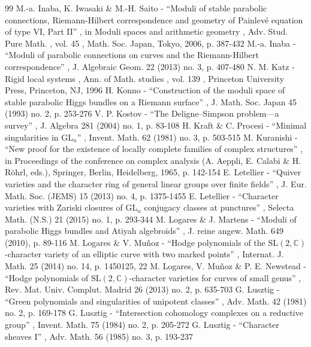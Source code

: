 \documentclass[11pt]{article}
\theoremstyle{definition}
\theoremstyle{plain}
\begin{document}
\begin{thebibliography}{99}
 M.-a. Inaba, K. Iwasaki \& M.-H. Saito - “Moduli of stable parabolic connections, Riemann-Hilbert correspondence and geometry of Painlevé equation of type VI, Part II” , in Moduli spaces and arithmetic geometry , Adv. Stud. Pure Math. , vol. 45 , Math. Soc. Japan, Tokyo, 2006, p. 387-432
 M.-a. Inaba - “Moduli of parabolic connections on curves and the Riemann-Hilbert correspondence” , J. Algebraic Geom. 22 (2013) no. 3, p. 407-480
 N. M. Katz - Rigid local systems , Ann. of Math. studies , vol. 139 , Princeton University Press, Princeton, NJ, 1996
 H. Konno - “Construction of the moduli space of stable parabolic Higgs bundles on a Riemann surface” , J. Math. Soc. Japan 45 (1993) no. 2, p. 253-276
 V. P. Kostov - “The Deligne–Simpson problem—a survey” , J. Algebra 281 (2004) no. 1, p. 83-108
 H. Kraft \& C. Procesi - “Minimal singularities in $\mathrm{GL}_{n}$” , Invent. Math. 62 (1981) no. 3, p. 503-515
 M. Kuranishi - “New proof for the existence of locally complete families of complex structures” , in Proceedings of the conference on complex analysis (A. Aeppli, E. Calabi \& H. Röhrl, eds.), Springer, Berlin, Heidelberg, 1965, p. 142-154
 E. Letellier - “Quiver varieties and the character ring of general linear groups over finite fields” , J. Eur. Math. Soc. (JEMS) 15 (2013) no. 4, p. 1375-1455
 E. Letellier - “Character varieties with Zariski closures of $\mathrm{GL}_n$ conjugacy classes at punctures” , Selecta Math. (N.S.) 21 (2015) no. 1, p. 293-344
 M. Logares \& J. Martens - “Moduli of parabolic Higgs bundles and Atiyah algebroids” , J. reine angew. Math. 649 (2010), p. 89-116
 M. Logares \& V. Muñoz - “Hodge polynomials of the $\mathrm{SL}(2,\mathbb{C})$-character variety of an elliptic curve with two marked points” , Internat. J. Math. 25 (2014) no. 14, p. 1450125, 22
 M. Logares, V. Muñoz \& P. E. Newstead - “Hodge polynomials of $\mathrm{SL}(2,\mathbb{C})$-character varieties for curves of small genus” , Rev. Mat. Univ. Complut. Madrid 26 (2013) no. 2, p. 635-703
 G. Lusztig - “Green polynomials and singularities of unipotent classes” , Adv. Math. 42 (1981) no. 2, p. 169-178
 G. Lusztig - “Intersection cohomology complexes on a reductive group” , Invent. Math. 75 (1984) no. 2, p. 205-272
 G. Lusztig - “Character sheaves I” , Adv. Math. 56 (1985) no. 3, p. 193-237

\end{thebibliography}
\end{document}
